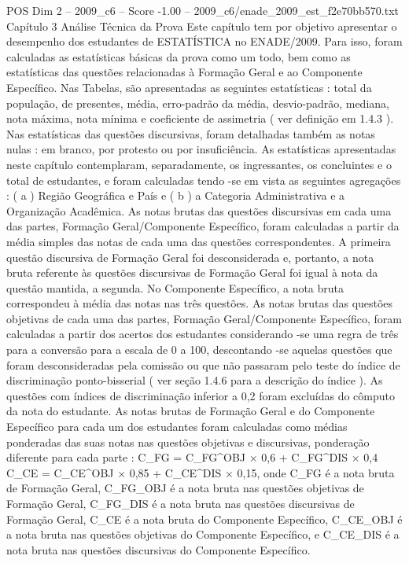 \begin{textsample}{POS Dim 2 – 2009\_c6 – Score -1.00 – 2009\_c6/enade\_2009\_est\_f2e70bb570.txt}  \label{ex:f2_pos_299}
Capítulo 3 Análise Técnica da Prova Este capítulo tem por objetivo apresentar o desempenho dos estudantes de ESTATÍSTICA no ENADE/2009.
Para isso, foram calculadas as estatísticas básicas da prova como um todo, bem como as estatísticas das questões relacionadas à Formação Geral e ao Componente Específico.
Nas Tabelas, são apresentadas as seguintes estatísticas : total da população, de presentes, média, erro-padrão da média, desvio-padrão, mediana, nota máxima, nota mínima e coeficiente de assimetria ( ver definição em 1.4.3 ).
Nas estatísticas das questões discursivas, foram detalhadas também as notas nulas : em branco, por protesto ou por insuficiência.
As estatísticas apresentadas neste capítulo contemplaram, separadamente, os ingressantes, os concluintes e o total de estudantes, e foram calculadas tendo -se em vista as seguintes agregações : ( a ) Região Geográfica e País e ( b ) a Categoria Administrativa e a Organização Acadêmica.
As notas brutas das questões discursivas em cada uma das partes, Formação Geral/Componente Específico, foram calculadas a partir da média simples das notas de cada uma das questões correspondentes.
A primeira questão discursiva de Formação Geral foi desconsiderada e, portanto, a nota bruta referente às questões discursivas de Formação Geral foi igual à nota da questão mantida, a segunda.
No Componente Específico, a nota bruta correspondeu à média das notas nas três questões.
As notas brutas das questões objetivas de cada uma das partes, Formação Geral/Componente Específico, foram calculadas a partir dos acertos dos estudantes considerando -se uma regra de três para a conversão para a escala de 0 a 100, descontando -se aquelas questões que foram desconsideradas pela comissão ou que não passaram pelo teste do índice de discriminação ponto-bisserial ( ver seção 1.4.6 para a descrição do índice ).
As questões com índices de discriminação inferior a 0,2 foram excluídas do cômputo da nota do estudante.
As notas brutas de Formação Geral e do Componente Específico para cada um dos estudantes foram calculadas como médias ponderadas das suas notas nas questões objetivas e discursivas, ponderação diferente para cada parte : C\_FG = C\_FG\textasciicircum{}OBJ × 0,6 + C\_FG\textasciicircum{}DIS × 0,4 C\_CE = C\_CE\textasciicircum{}OBJ × 0,85 + C\_CE\textasciicircum{}DIS × 0,15, onde C\_FG é a nota bruta de Formação Geral, C\_FG\_OBJ é a nota bruta nas questões objetivas de Formação Geral, C\_FG\_DIS é a nota bruta nas questões discursivas de Formação Geral, C\_CE é a nota bruta do Componente Específico, C\_CE\_OBJ é a nota bruta nas questões objetivas do Componente Específico, e C\_CE\_DIS é a nota bruta nas questões discursivas do Componente Específico.

\end{textsample}
